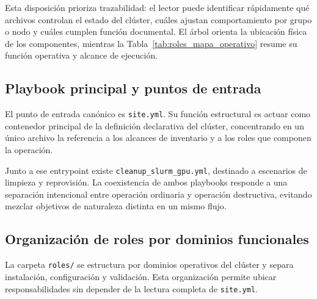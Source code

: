 Esta disposición prioriza trazabilidad: el lector puede identificar rápidamente qué archivos controlan el estado del clúster, cuáles ajustan comportamiento por grupo o nodo y cuáles cumplen función documental. El árbol orienta la ubicación física de los componentes, mientras la Tabla~\ref{tab:roles_mapa_operativo} resume su función operativa y alcance de ejecución.

\subsection{Playbook principal y puntos de entrada}

El punto de entrada canónico es \texttt{site.yml}. Su función estructural es actuar como contenedor principal de la definición declarativa del clúster, concentrando en un único archivo la referencia a los alcances de inventario y a los roles que componen la operación.

Junto a ese entrypoint existe \texttt{cleanup\_slurm\_gpu.yml}, destinado a escenarios de limpieza y reprovisión. La coexistencia de ambos playbooks responde a una separación intencional entre operación ordinaria y operación destructiva, evitando mezclar objetivos de naturaleza distinta en un mismo flujo.

\subsection{Organización de roles por dominios funcionales}

La carpeta \texttt{roles/} se estructura por dominios operativos del clúster y separa instalación, configuración y validación. Esta organización permite ubicar responsabilidades sin depender de la lectura completa de \texttt{site.yml}.

